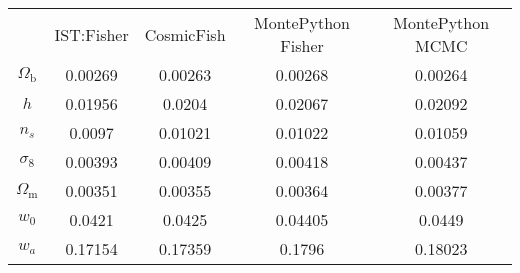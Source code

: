 \begin{table}
\centering
\begin{tabular}{|c|c|c|c|c|}
 & IST:Fisher & CosmicFish & MontePython Fisher & MontePython MCMC \\
$\Omega_\mathrm{b}$ & 0.00269 & 0.00263 & 0.00268 & 0.00264 \\
$h$ & 0.01956 & 0.0204 & 0.02067 & 0.02092 \\
$n_s$ & 0.0097 & 0.01021 & 0.01022 & 0.01059 \\
$\sigma_8$ & 0.00393 & 0.00409 & 0.00418 & 0.00437 \\
$\Omega_\mathrm{m}$ & 0.00351 & 0.00355 & 0.00364 & 0.00377 \\
$w_0$ & 0.0421 & 0.0425 & 0.04405 & 0.0449 \\
$w_a$ & 0.17154 & 0.17359 & 0.1796 & 0.18023 \\
\end{tabular}
\end{table}
